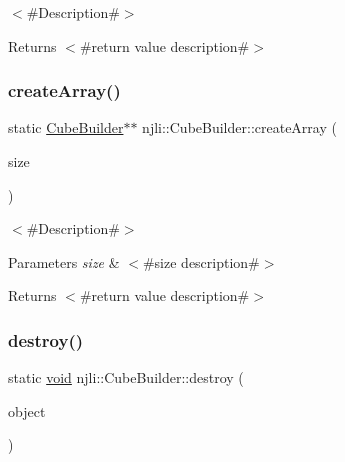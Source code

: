 $<$\#\+Description\#$>$

\begin{DoxyReturn}{Returns}
$<$\#return value description\#$>$ 
\end{DoxyReturn}
\mbox{\label{classnjli_1_1_cube_builder_ad7a6e18215ce2df88ec74502725c4e83}} 
\subsubsection{\texorpdfstring{create\+Array()}{createArray()}}
{\footnotesize\ttfamily static \mbox{\hyperlink{classnjli_1_1_cube_builder}{Cube\+Builder}}$\ast$$\ast$ njli\+::\+Cube\+Builder\+::create\+Array (\begin{DoxyParamCaption}\item[{const \mbox{\hyperlink{_util_8h_a10e94b422ef0c20dcdec20d31a1f5049}{u32}}}]{size }\end{DoxyParamCaption})\hspace{0.3cm}{\ttfamily [static]}}

$<$\#\+Description\#$>$


\begin{DoxyParams}{Parameters}
{\em size} & $<$\#size description\#$>$\\
\hline
\end{DoxyParams}
\begin{DoxyReturn}{Returns}
$<$\#return value description\#$>$ 
\end{DoxyReturn}
\mbox{\label{classnjli_1_1_cube_builder_ab2580dcc82092bb1b89e7502c968cd70}} 
\subsubsection{\texorpdfstring{destroy()}{destroy()}}
{\footnotesize\ttfamily static \mbox{\hyperlink{_thread_8h_af1e856da2e658414cb2456cb6f7ebc66}{void}} njli\+::\+Cube\+Builder\+::destroy (\begin{DoxyParamCaption}\item[{\mbox{\hyperlink{classnjli_1_1_cube_builder}{Cube\+Builder}} $\ast$}]{object }\end{DoxyParamCaption})\hspace{0.3cm}{\ttfamily [static]}}

